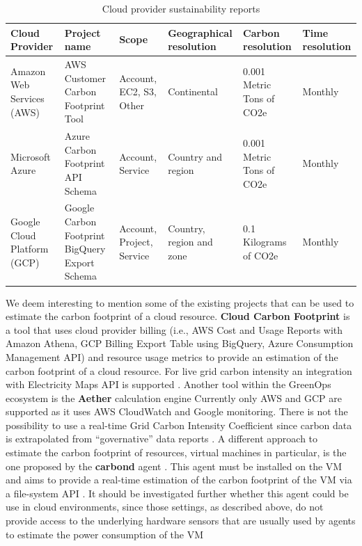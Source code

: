 \begin{table}[t]
  \centering
  \renewcommand{\arraystretch}{1.2} %
  \setlength{\extrarowheight}{2pt} %
  \begin{tabularx}{\textwidth}{|X|X|X|X|X|X|}
  \hline
  \textbf{Cloud Provider}     & \textbf{Project name}                          & \textbf{Scope}            & \textbf{Geographical resolution} & \textbf{Carbon resolution} & \textbf{Time resolution} \\ \hline
  Amazon Web Services (AWS)   & AWS Customer Carbon Footprint Tool             & Account, EC2, S3, Other   & Continental                      & 0.001 Metric Tons of CO2e  & Monthly                  \\ \hline
  Microsoft Azure             & Azure Carbon Footprint API Schema              & Account, Service          & Country and region               & 0.001 Metric Tons of CO2e  & Monthly                  \\ \hline
  Google Cloud Platform (GCP) & Google Carbon Footprint BigQuery Export Schema & Account, Project, Service & Country, region and zone         & 0.1 Kilograms of CO2e      & Monthly                  \\ \hline
  \end{tabularx}
  \caption{Cloud provider sustainability reports}
  \label{tab:cloud_carbon_emissions_reports}
\end{table}

We deem interesting to mention some of the existing projects that can be used to estimate the carbon footprint of a cloud resource.
\textbf{Cloud Carbon Footprint} \cite{cloud_carbon_footprint} is a tool that uses cloud provider billing (i.e., AWS Cost and Usage Reports with Amazon Athena, GCP Billing Export Table using BigQuery, Azure Consumption Management API) and resource usage metrics to provide an estimation of the carbon footprint of a cloud resource. For live grid carbon intensity an integration with Electricity Maps API is supported \cite{cloud_carbon_footprint}.
Another tool within the GreenOps ecosystem is the \textbf{Aether} calculation engine \cite{aether}
Currently only AWS and GCP are supported as it uses AWS CloudWatch and Google monitoring.
There is not the possibility to use a real-time Grid Carbon Intensity Coefficient since carbon data is extrapolated from “governative” data reports \cite{aether}.
A different approach to estimate the carbon footprint of resources, virtual machines in particular, is the one proposed by the \textbf{carbond} agent \cite{carbond:2023:hotcarbon}. 
This agent must be installed on the VM and aims to provide a real-time estimation of the carbon footprint of the VM via a file-system API \cite{carbond:2023:hotcarbon}.
It should be investigated further whether this agent could be use in cloud environments, since those settings, as described above, do not provide access to the underlying hardware sensors that are usually used by agents to estimate the power consumption of the VM

